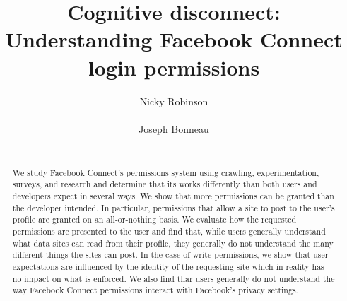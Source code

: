 \documentclass[10pt]{sig-alternate-10pt}
\begin{document}
\sloppy



\title{Cognitive disconnect:\\ Understanding Facebook Connect login permissions}

\author{
\alignauthor
Nicky Robinson\\
       \\
\alignauthor
Joseph Bonneau\\
       \\
}

\maketitle

\begin{abstract}
We study Facebook Connect's permissions system using crawling, experimentation, surveys, and research and determine that its works differently than both users and developers expect in several ways.
We show that more permissions can be granted than the developer intended.
In particular, permissions that allow a site to post to the user's profile are granted on an all-or-nothing basis.
We evaluate how the requested permissions are presented to the user and find that, while users generally understand what data sites can read from their profile, they generally do not understand the many different things the sites can post.
In the case of write permissions, we show that user expectations are influenced by the identity of the requesting site which in reality has no impact on what is enforced.
We also find thar users generally do not understand the way Facebook Connect permissions interact with Facebook's privacy settings.
\end{abstract}

\end{document}
